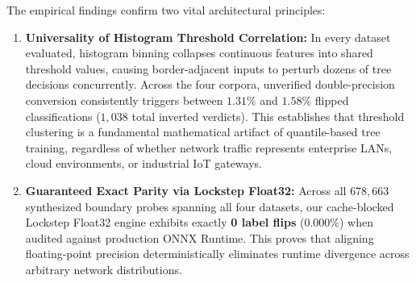 The empirical findings confirm two vital architectural principles:
\begin{enumerate}
    \item \textbf{Universality of Histogram Threshold Correlation:} In every dataset evaluated, histogram binning collapses continuous features into shared threshold values, causing border-adjacent inputs to perturb dozens of tree decisions concurrently. Across the four corpora, unverified double-precision conversion consistently triggers between $1.31\%$ and $1.58\%$ flipped classifications ($1{,}038$ total inverted verdicts). This establishes that threshold clustering is a fundamental mathematical artifact of quantile-based tree training, regardless of whether network traffic represents enterprise LANs, cloud environments, or industrial IoT gateways.
    \item \textbf{Guaranteed Exact Parity via Lockstep Float32:} Across all $678{,}663$ synthesized boundary probes spanning all four datasets, our cache-blocked Lockstep Float32 engine exhibits exactly \textbf{0 label flips} ($0.000\%$) when audited against production ONNX Runtime. This proves that aligning floating-point precision deterministically eliminates runtime divergence across arbitrary network distributions.
\end{enumerate}
